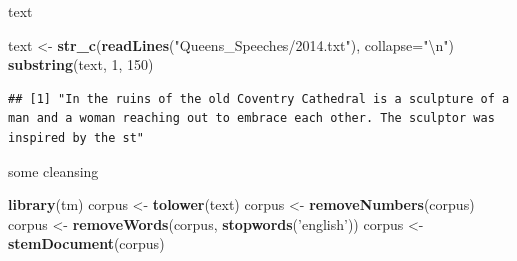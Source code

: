 \documentclass[ignorenonframetext,]{beamer}
\newenvironment{Shaded}{\begin{snugshade}}{\end{snugshade}}
\newcommand{\KeywordTok}[1]{\textcolor[rgb]{0.13,0.29,0.53}{\textbf{{#1}}}}
\newcommand{\DataTypeTok}[1]{\textcolor[rgb]{0.13,0.29,0.53}{{#1}}}
\newcommand{\DecValTok}[1]{\textcolor[rgb]{0.00,0.00,0.81}{{#1}}}
\newcommand{\CharTok}[1]{\textcolor[rgb]{0.31,0.60,0.02}{{#1}}}
\newcommand{\StringTok}[1]{\textcolor[rgb]{0.31,0.60,0.02}{{#1}}}
\newcommand{\NormalTok}[1]{{#1}}
\begin{document}
\begin{frame}[fragile]{text}

\begin{Shaded}
\begin{Highlighting}[]
\NormalTok{text  <-}\StringTok{ }\KeywordTok{str_c}\NormalTok{(}\KeywordTok{readLines}\NormalTok{(}\StringTok{"Queens_Speeches/2014.txt"}\NormalTok{),}
               \DataTypeTok{collapse=}\StringTok{"}\CharTok{\textbackslash{}n}\StringTok{"}\NormalTok{)}
\KeywordTok{substring}\NormalTok{(text, }\DecValTok{1}\NormalTok{, }\DecValTok{150}\NormalTok{)}
\end{Highlighting}
\end{Shaded}

\begin{verbatim}
## [1] "In the ruins of the old Coventry Cathedral is a sculpture of a man and a woman reaching out to embrace each other. The sculptor was inspired by the st"
\end{verbatim}

\end{frame}

\begin{frame}[fragile]{some cleansing}

\begin{Shaded}
\begin{Highlighting}[]
\KeywordTok{library}\NormalTok{(tm)}
\NormalTok{corpus <-}\StringTok{ }\KeywordTok{tolower}\NormalTok{(text)}
\NormalTok{corpus <-}\StringTok{ }\KeywordTok{removeNumbers}\NormalTok{(corpus)}
\NormalTok{corpus <-}\StringTok{ }\KeywordTok{removeWords}\NormalTok{(corpus, }\KeywordTok{stopwords}\NormalTok{(}\StringTok{'english'}\NormalTok{))}
\NormalTok{corpus <-}\StringTok{ }\KeywordTok{stemDocument}\NormalTok{(corpus)}
\end{Highlighting}
\end{Shaded}

\end{frame}
\end{document}
